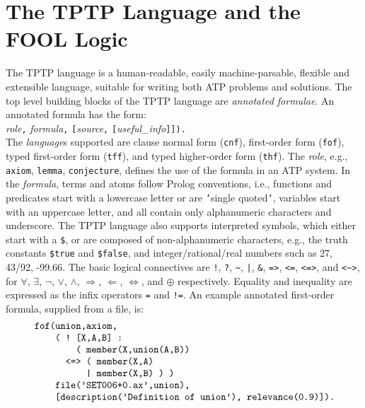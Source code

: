 \documentclass{easychair}
\begin{document}
\section{The TPTP Language and the FOOL Logic}
\label{TPTPFOOL}

The TPTP language is a human-readable, easily machine-parsable, flexible and
extensible language, suitable for writing both ATP problems and solutions.
The top level building blocks of the TPTP language are {\em annotated
formulae}.
An annotated formula has the form:\\
{\em role}{\tt ,}
{\em formula}{\tt ,}
{\tt [}{\em source}{\tt ,}
{\tt [}{\em useful\_info}{\tt ]]).}\\
The {\em language}s supported are clause normal form ({\tt cnf}),
first-order form ({\tt fof}), typed first-order form ({\tt tff}), and
typed higher-order form ({\tt thf}).
The {\em role}, e.g., {\tt axiom}, {\tt lemma}, {\tt conjecture},
defines the use of the formula in an ATP system.
In the {\em formula}, terms and atoms follow Prolog conventions, i.e.,
functions and predicates start with a lowercase letter or are {\tt '}single
quoted{\tt '}, variables start with an uppercase letter, and all
contain only alphanumeric characters and underscore.
The TPTP language also supports interpreted symbols, which either start with a
{\tt \$}, or are composed of non-alphanumeric characters, e.g., the truth
constants {\tt \$true} and {\tt \$false}, and integer/rational/real
numbers such as 27, 43/92, -99.66.
The basic logical connectives are
{\tt !}, {\tt ?}, {\tt \verb|~|}, {\tt |}, {\tt \&}, {\tt =>}, {\tt <=},
{\tt <=>}, and {\tt <\verb|~|>},
for
$\forall$, $\exists$, $\neg$, $\vee$, $\wedge$, $\Rightarrow$, $\Leftarrow$,
$\Leftrightarrow$, and $\oplus$ respectively.
Equality and inequality are expressed as the infix operators {\tt =} and
{\tt !=}.
An example annotated first-order formula, supplied from a file, is:
\[
\begin{minipage}{\textwidth}
\begin{verbatim}
    fof(union,axiom,
        ( ! [X,A,B] :
            ( member(X,union(A,B))
          <=> ( member(X,A)
              | member(X,B) ) )
        file('SET006+0.ax',union),
        [description('Definition of union'), relevance(0.9)]).
\end{verbatim}
\end{minipage}
\]
\end{document}
